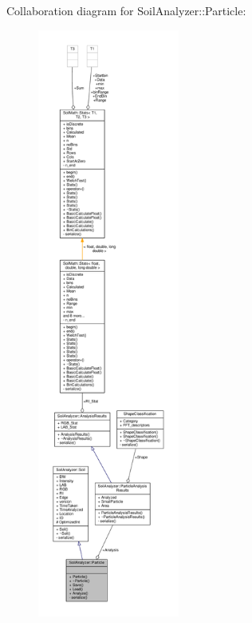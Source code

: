 Collaboration diagram for Soil\+Analyzer\+:\+:Particle\+:\nopagebreak
\begin{figure}[H]
\begin{center}
\leavevmode
\includegraphics[height=550pt]{class_soil_analyzer_1_1_particle__coll__graph}
\end{center}
\end{figure}
